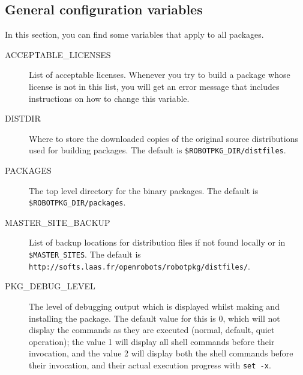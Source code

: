 \subsection{General configuration variables} %

In  this  section,  you can   find some  variables   that apply  to  all \robotpkg
packages.


\begin{description}
   \item[ACCEPTABLE\_LICENSES] List of acceptable licenses. Whenever you try to
   build a package  whose license is  not in this  list, you will get  an error
   message that includes instructions on how to change this variable.

   \item[DISTDIR] Where to store the downloaded copies of the original source
   distributions used for building \robotpkg packages. The default is
   {\tt \${ROBOTPKG\_DIR}/distfiles}.

   \item[PACKAGES] The top level directory for the binary packages. The default
   is  {\tt \${ROBOTPKG\_DIR}/packages}.


   \item[MASTER\_SITE\_BACKUP] List  of backup locations for distribution files
   if not found locally  or  in {\tt \${MASTER\_SITES}}.  The default  is\\
   {\tt http://softs.laas.fr/openrobots/robotpkg/distfiles/}.

   \item[PKG\_DEBUG\_LEVEL] The  level of debugging  output  which is displayed
   whilst making and installing the package.  The  default value for this is 0,
   which will not  display the commands as they  are executed (normal, default,
   quiet  operation); the value 1 will  display all shell commands before their
   invocation,  and  the value  2 will  display both the  shell commands before
   their invocation, and their actual execution progress with {\tt set -x}.
\end{description}



